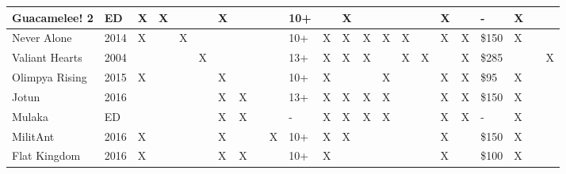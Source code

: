 \begin{table}[]
{\begin{tabular}{|l|l|l|l|l|l|l|l|l|l|l|l|l|l|l|l|l|l|l|l|l|l|l|}
			Guacamelee! 2                                & ED                     & X          & X           &        &        & X      &          &     &         & 10+  &    & X    &           &          &       &         & X        &          & -                                           & X          &               &         \\ \hline
			Never Alone                                  & 2014                   & X          &             & X      &        &        &          &     &         & 10+  & X  & X    & X         & X        & X     &         & X        & X        & \$150                                       & X          &               &         \\ \hline
			Valiant Hearts                               & 2004                   &            &             &        & X      &        &          &     &         & 13+  & X  & X    & X         &          & X     & X       &          & X        & \$285                                       &            &               & X       \\ \hline
			Olimpya Rising                               & 2015                   & X          &             &        &        & X      &          &     &         & 10+  & X  &      &           & X        &       &         & X        & X        & \$95                                        & X          &               &         \\ \hline
			Jotun                      & 2016                   &            &             &        &        & X      & X        &     &         & 13+  & X  & X    & X         & X        &       &         & X        & X        & \$150                                       & X          &               &         \\ \hline
			Mulaka                                       & ED                     &            &             &        &        & X      & X        &     &         & -    & X  & X    & X         & X        &       &         & X        & X        & -                                           & X          &               &         \\ \hline
			MilitAnt                                     & 2016                   & X          &             &        &        & X      &          &     & X       & 10+  & X  & X    &           &          &       &         & X        &          & \$150                                       & X          &               &         \\ \hline
			Flat Kingdom                                 & 2016                   & X          &             &        &        & X      & X        &     &         & 10+  & X  &      &           &          &       &         & X        &          & \$100                                       & X          &               &         \\ \hline

\end{tabular}}
\end{table}
